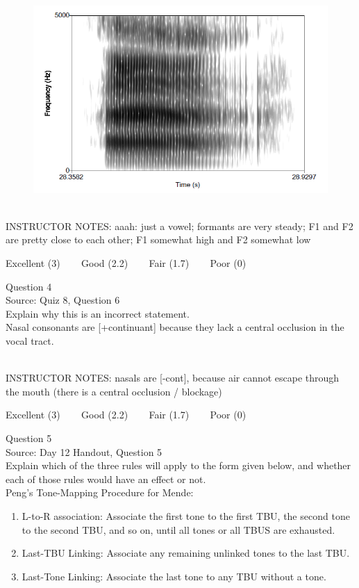 \documentclass[12pt]{article}
\begin{document}
\begin{figure}[H]
\includegraphics{../images/spectrogram_aaah.png}
\end{figure}

~\\
INSTRUCTOR NOTES: aaah: just a vowel; formants are very steady; F1 and F2 are pretty close to each other; F1 somewhat high and F2 somewhat low


\vfill
Excellent (3) ~~~ Good (2.2) ~~~ Fair (1.7) ~~~ Poor (0)
\newpage

{\large Question 4}\\

Source: Quiz 8, Question 6\\

Explain why this is an incorrect statement.\\

Nasal consonants are {[+continuant]} because they lack a central occlusion in the vocal tract.


~\\
INSTRUCTOR NOTES: nasals are [-cont], because air cannot escape through the mouth (there is a central occlusion / blockage)


\vfill
Excellent (3) ~~~ Good (2.2) ~~~ Fair (1.7) ~~~ Poor (0)
\newpage

{\large Question 5}\\

Source: Day 12 Handout, Question 5\\

Explain which of the three rules will apply to the form given below, and whether each of those rules would have an effect or not.\\

Peng’s Tone-Mapping Procedure for Mende: \begin{enumerate} \item L-to-R association: Associate the first tone to the first TBU, the second tone to the second TBU, and so on, until all tones or all TBUS are exhausted. \item Last-TBU Linking: Associate any remaining unlinked tones to the last TBU. \item Last-Tone Linking: Associate the last tone to any TBU without a tone. \end{enumerate}
\end{document}
